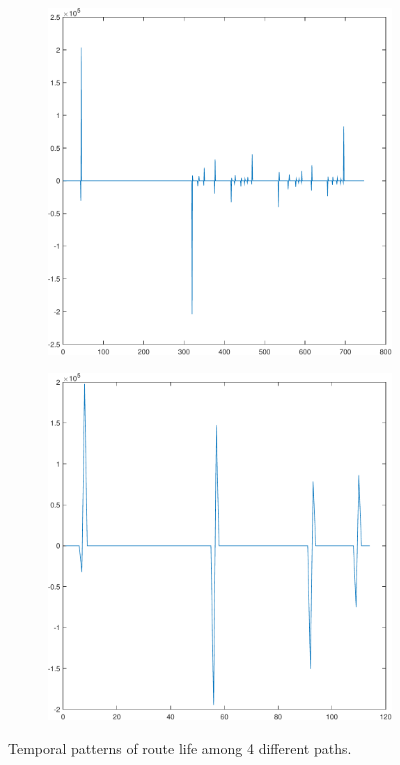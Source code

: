 \documentclass[sigconf]{acmart}
\begin{document}
\begin{figure}[tp]
\begin{subfigure}[t]{0.4\linewidth}
			\label{fig:3.1b}
		\end{subfigure}
		\begin{subfigure}[t]{0.4\linewidth}
			\centering
			\includegraphics[width=0.95\linewidth, trim={100 100 0 0}, clip=true]{fig/total_life_21}
			\label{fig:3.1c}
		\end{subfigure}
		\begin{subfigure}[t]{0.4\linewidth}
			\centering
			\includegraphics[width=0.95\linewidth, trim={100 100 0 0}, clip]{fig/total_life_30}
			\label{fig:3.1d}
		\end{subfigure}
		\caption{Temporal patterns of route life among 4 different paths.}
		\label{fig:3.1}
	\end{figure}
	
\end{document}
